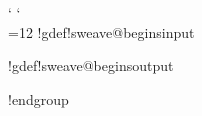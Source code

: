 \def\sweave@addoutput#1{%
  \expandafter\sweave@addtobuffer\expandafter{#1}%
  \sweave@outputreadytrue %
}

\def\sweave@flushbuffer#1{%
  \immediate\write#1{\the\sweave@linebuffer}%
  \sweave@linebuffer={}%
  \sweave@outputreadyfalse%
}

\edef\sweave@parpattern{\string\par}

\begingroup
  \catcode`
  \catcode`\\=12
  !gdef!sweave@beginsinput{\begin{Sinput}}
  !gdef!sweave@endsinput{\end{Sinput}}
  !gdef!sweave@beginsoutput{\begin{Soutput}}
  !gdef!sweave@endsoutput{\end{Soutput}}
!endgroup %


